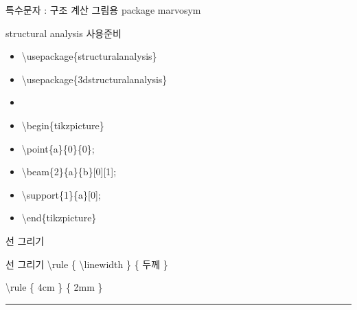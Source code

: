 \documentclass[ aspectratio=149,  14pt,blue,xcolor=pdftex,dvipsnames,table,handout,notes]{beamer}
\begin{document}
\begin{frame}[t,shrink=0]{특수문자 : 구조 계산 그림용 package marvosym}
			\begin{block}{structural analysis 사용준비}
			\begin{itemize}
			\item[] \textbackslash usepackage\{structuralanalysis\}
			\item[] \textbackslash usepackage\{3dstructuralanalysis\}
			\item[] 
			\item[] \textbackslash begin\{tikzpicture\}
			\item[] \textbackslash point\{a\}\{0\}\{0\};
			\item[] \textbackslash beam\{2\}\{a\}\{b\}[0][1];
			\item[] \textbackslash support\{1\}\{a\}[0];
			\item[] \textbackslash end\{tikzpicture\}
			\end{itemize}
			\end{block}




		\end{frame}






		\begin{frame}[t]{선 그리기}

			\begin{block} {선 그리기}
			\textbackslash rule \{ \textbackslash linewidth \} \{ 두께 \}
			\end{block}

			\begin{example}
			\textbackslash rule \{ 4cm \} \{ 2mm \}
			\end{example}

			\rule{4cm}{2mm}

		\end{frame}







\end{document}
